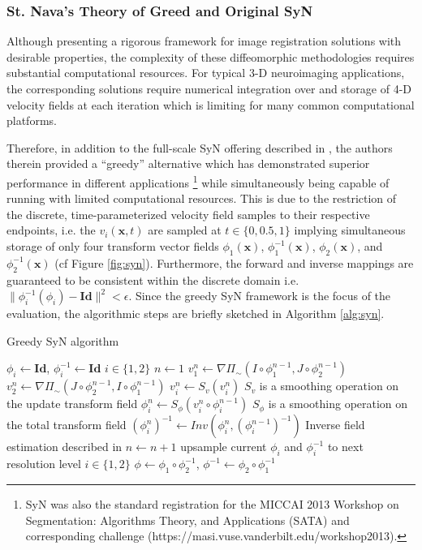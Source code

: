 \documentclass{frontiersSCNS}
\begin{document}
\subsubsection{St. Nava's Theory of Greed and Original SyN}

Although presenting a rigorous framework for image registration solutions
with desirable properties, the complexity of these diffeomorphic methodologies
requires substantial computational resources.  For typical 3-D neuroimaging
applications, the corresponding solutions require numerical integration over
and storage of 4-D velocity fields at each iteration which is limiting for
many common computational platforms.

Therefore, in addition to the full-scale
SyN offering described in \cite{avants2008}, the authors therein
provided a ``greedy'' alternative which has demonstrated superior performance
in different applications \citep{avants2011,klein2009,murphy2011}%
\footnote{
SyN was also the standard registration for the MICCAI 2013
Workshop on Segmentation:  Algorithms Theory, and Applications (SATA)
and corresponding challenge (https://masi.vuse.vanderbilt.edu/workshop2013).
}
while simultaneously being capable of running with limited computational
resources.  This is due to the restriction of the discrete, time-parameterized
velocity field samples to their respective
endpoints, i.e. the $v_i(\mathbf{x},t)$ are sampled at $t \in \{0,0.5,1\}$
implying simultaneous storage of only four transform vector fields
$\phi_1(\mathbf{x})$,
$\phi_1^{-1}(\mathbf{x})$, $\phi_2(\mathbf{x})$, and $\phi_2^{-1}(\mathbf{x})$
(cf Figure \ref{fig:syn}).  Furthermore, the forward and inverse
mappings are guaranteed to be consistent within the discrete domain i.e. $\|
\phi_i^{-1}(\phi_i) - \mathbf{Id} \|^2 < \epsilon$.   
Since the greedy SyN framework is the focus of the evaluation,
the algorithmic steps are briefly sketched
in Algorithm \ref{alg:syn}.

\begin{algorithm}
\caption{Greedy SyN algorithm}
\label{alg:syn}
\begin{algorithmic}
\State $\phi_i \leftarrow \mathbf{Id}$, $\phi_i^{-1} \leftarrow \mathbf{Id}$
\Comment $i \in \{1,2\}$
\State $n \leftarrow 1$
  \State $v_1^n \leftarrow \nabla \Pi_{\sim} \left(I\circ\phi_1^{n-1},J\circ\phi_2^{n-1}\right)$
  \State $v_2^n \leftarrow \nabla \Pi_{\sim} \left(J\circ\phi_2^{n-1},I\circ\phi_1^{n-1}\right)$
  \State $v_i^n \leftarrow S_v( v_i^n )$      \Comment $S_v$ is a smoothing operation on the update transform field
  \State $\phi_i^n \leftarrow S_\phi( v_i^n \circ \phi_i^{n-1} )$      \Comment $S_\phi$ is a smoothing operation on the total transform field
  \State $\left(\phi_i^n\right)^{-1} \leftarrow Inv\left(\phi_i^n, \left(\phi_i^{n-1}\right)^{-1}\right)$
    \Comment Inverse field estimation described in \cite{avants2008}
  \State $n \leftarrow n + 1$
\EndWhile
  \State upsample current $\phi_i$ and $\phi_i^{-1}$ to next resolution level 
  \Comment $i \in \{1,2\}$
\EndFor
\State \Return $\phi \leftarrow \phi_1 \circ \phi_2^{-1}$, $\phi^{-1} \leftarrow \phi_2 \circ \phi_1^{-1}$
\end{algorithmic}
\end{algorithm}
\end{document}
